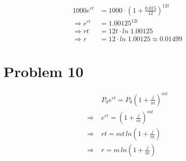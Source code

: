 \documentclass[12pt]{article}
\begin{document}
\begin{align*}
1000e^{rt} &= 1000\cdot(1+\frac{0.015}{12})^{12t} \\
\Rightarrow e^{rt} &= 1.00125^{12t} \\
\Rightarrow rt &= 12t\cdot ln\; 1.00125 \\
\Rightarrow r &= 12\cdot ln\;1.00125\approx 0.01499
\end{align*}

\section*{Problem 10}

\begin{align*}
&P_0e^{rt} = P_0(1+\frac{j}{m})^{mt} \\
\Rightarrow\; &e^{rt} = (1+\frac{j}{m})^{mt} \\
\Rightarrow\; &rt = mt\,ln(1+\frac{j}{m}) \\
\Rightarrow\; &r = m\,ln(1+\frac{j}{m})
\end{align*}
\end{document}
